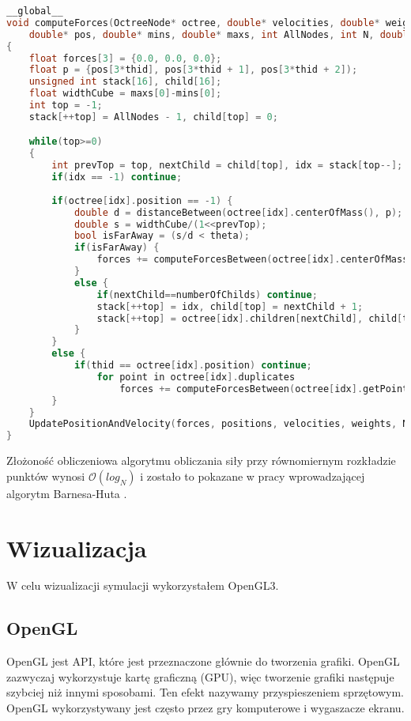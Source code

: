 \documentclass[14pt,twoside,a4paper]{article}
\theoremstyle{definition}
\begin{document}
\newpage
{} 
\begin{lstlisting}[language=C++, frame=single, framerule=2pt, caption=Obliczanie siły oddziałującej na ciało w układzie]
__global__
void computeForces(OctreeNode* octree, double* velocities, double* weights, 
    double* pos, double* mins, double* maxs, int AllNodes, int N, double dt) 
{	
    float forces[3] = {0.0, 0.0, 0.0};
    float p = {pos[3*thid], pos[3*thid + 1], pos[3*thid + 2]);
    unsigned int stack[16], child[16];
    float widthCube = maxs[0]-mins[0];
    int top = -1;
    stack[++top] = AllNodes - 1, child[top] = 0;

    while(top>=0) 
    {
    	int prevTop = top, nextChild = child[top], idx = stack[top--];
        if(idx == -1) continue;
        
        if(octree[idx].position == -1) {
            double d = distanceBetween(octree[idx].centerOfMass(), p);
            double s = widthCube/(1<<prevTop);
            bool isFarAway = (s/d < theta);
            if(isFarAway) {
            	forces += computeForcesBetween(octree[idx].centerOfMass, p);
            }
            else {
                if(nextChild==numberOfChilds) continue;
                stack[++top] = idx, child[top] = nextChild + 1;
                stack[++top] = octree[idx].children[nextChild], child[top] = 0;
            }
        } 
        else {
       	    if(thid == octree[idx].position) continue;
       	    	for point in octree[idx].duplicates
                    forces += computeForcesBetween(octree[idx].getPoint(point), p);	
        }
    }    
    UpdatePositionAndVelocity(forces, positions, velocities, weights, N, dt);
}
\end{lstlisting}

Złożoność obliczeniowa algorytmu obliczania siły przy równomiernym rozkładzie punktów wynosi $\mathcal{O}(log_{N})$ i zostało to pokazane w pracy wprowadzającej algorytm Barnesa-Huta \cite{barnhut}.

\section{\LARGE Wizualizacja}
	
W celu wizualizacji symulacji wykorzystałem OpenGL3. 

\subsection{\large OpenGL}
OpenGL \cite{opengl} jest API, które jest przeznaczone głównie do tworzenia grafiki. OpenGL zazwyczaj wykorzystuje kartę graficzną (GPU), więc tworzenie grafiki następuje szybciej niż innymi sposobami. Ten efekt nazywamy przyspieszeniem sprzętowym. OpenGL wykorzystywany jest często przez gry komputerowe i wygaszacze ekranu.
\end{document}
